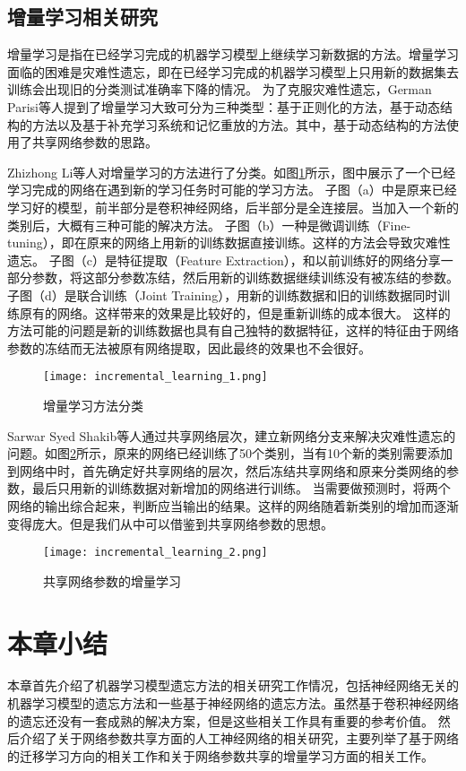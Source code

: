 \subsection{增量学习相关研究}
增量学习是指在已经学习完成的机器学习模型上继续学习新数据的方法。增量学习面临的困难是灾难性遗忘，即在已经学习完成的机器学习模型上只用新的数据集去训练会出现旧的分类测试准确率下降的情况。
为了克服灾难性遗忘，German Parisi等人\cite{PARISI201954}提到了增量学习大致可分为三种类型：基于正则化的方法，基于动态结构的方法以及基于补充学习系统和记忆重放的方法。其中，基于动态结构的方法使用了共享网络参数的思路。

Zhizhong Li等人\cite{8107520}对增量学习的方法进行了分类。如图\ref{fig:incremental_learning_1}所示，图中展示了一个已经学习完成的网络在遇到新的学习任务时可能的学习方法。
子图（a）中是原来已经学习好的模型，前半部分是卷积神经网络，后半部分是全连接层。当加入一个新的类别后，大概有三种可能的解决方法。
子图（b）一种是微调训练（Fine-tuning），即在原来的网络上用新的训练数据直接训练。这样的方法会导致灾难性遗忘。
子图（c）是特征提取（Feature Extraction），和以前训练好的网络分享一部分参数，将这部分参数冻结，然后用新的训练数据继续训练没有被冻结的参数。
子图（d）是联合训练（Joint Training），用新的训练数据和旧的训练数据同时训练原有的网络。这样带来的效果是比较好的，但是重新训练的成本很大。
这样的方法可能的问题是新的训练数据也具有自己独特的数据特征，这样的特征由于网络参数的冻结而无法被原有网络提取，因此最终的效果也不会很好。
\begin{figure}
    \centering
    \texttt{[image: incremental\_learning\_1.png]}
    \caption{增量学习方法分类}
    \label{fig:incremental_learning_1}
\end{figure}

Sarwar Syed Shakib等人\cite{Sarwar_2020}通过共享网络层次，建立新网络分支来解决灾难性遗忘的问题。如图\ref{fig:incremental_learning_2}所示，原来的网络已经训练了50个类别，当有10个新的类别需要添加到网络中时，首先确定好共享网络的层次，然后冻结共享网络和原来分类网络的参数，最后只用新的训练数据对新增加的网络进行训练。
当需要做预测时，将两个网络的输出综合起来，判断应当输出的结果。这样的网络随着新类别的增加而逐渐变得庞大。但是我们从中可以借鉴到共享网络参数的思想。
\begin{figure}
    \centering
    \texttt{[image: incremental\_learning\_2.png]}
    \caption{共享网络参数的增量学习}
    \label{fig:incremental_learning_2}
\end{figure}


\section{本章小结}
本章首先介绍了机器学习模型遗忘方法的相关研究工作情况，包括神经网络无关的机器学习模型的遗忘方法和一些基于神经网络的遗忘方法。虽然基于卷积神经网络的遗忘还没有一套成熟的解决方案，但是这些相关工作具有重要的参考价值。
然后介绍了关于网络参数共享方面的人工神经网络的相关研究，主要列举了基于网络的迁移学习方向的相关工作和关于网络参数共享的增量学习方面的相关工作。